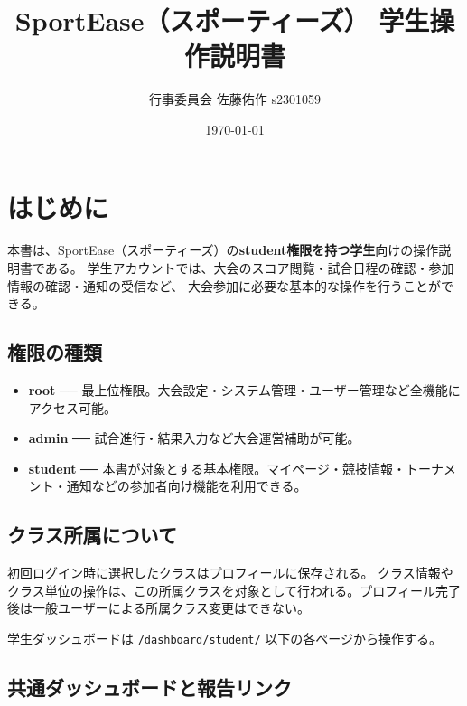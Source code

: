 \documentclass[12pt]{ltjsarticle}
\newcommand{\code}[1]{\colorbox{gray!20}{\texttt{#1}}}
\begin{document}
\title{SportEase（スポーティーズ） 学生操作説明書}
\author{行事委員会 佐藤佑作 s2301059}
\date{\today}
\maketitle
\tableofcontents

\newpage

\section{はじめに}

本書は、SportEase（スポーティーズ）の\textbf{student権限を持つ学生}向けの操作説明書である。
学生アカウントでは、大会のスコア閲覧・試合日程の確認・参加情報の確認・通知の受信など、
大会参加に必要な基本的な操作を行うことができる。

\subsection*{権限の種類}
\begin{itemize}
  \item \textbf{root} ── 最上位権限。大会設定・システム管理・ユーザー管理など全機能にアクセス可能。
  \item \textbf{admin} ── 試合進行・結果入力など大会運営補助が可能。
  \item \textbf{student} ── 本書が対象とする基本権限。マイページ・競技情報・トーナメント・通知などの参加者向け機能を利用できる。
\end{itemize}

\subsection*{クラス所属について}

初回ログイン時に選択したクラスはプロフィールに保存される。
クラス情報やクラス単位の操作は、この所属クラスを対象として行われる。プロフィール完了後は一般ユーザーによる所属クラス変更はできない。

学生ダッシュボードは \code{/dashboard/student/} 以下の各ページから操作する。

\subsection*{共通ダッシュボードと報告リンク}
\end{document}
